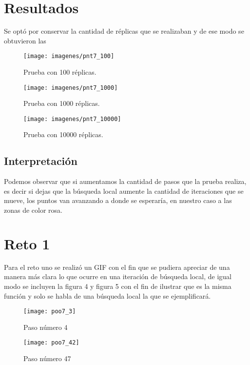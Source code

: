 \documentclass[a4paper]{article}
\begin{document}
\section{Resultados}
Se optó por conservar la cantidad de réplicas que se realizaban y de ese modo se obtuvieron las 

\begin{figure}[h!]
\centering
\texttt{[image: imagenes/pnt7\_100]}
\caption[Prueba con 100 réplicas.]{Prueba con 100 réplicas.}
\label{fig:pnt7_100}
\end{figure}

\begin{figure}[h!]
\centering
\texttt{[image: imagenes/pnt7\_1000]}
\caption{Prueba con 1000 réplicas.}
\label{fig:pnt7_1000}
\end{figure}
\begin{figure}[h!]
\centering
\texttt{[image: imagenes/pnt7\_10000]}
\caption{Prueba con 10000 réplicas.}
\label{fig:pnt7_10000}
\end{figure}


\subsection{Interpretación}
Podemos observar que si aumentamos la cantidad de pasos que la prueba realiza, es decir si dejas que la búsqueda local aumente la cantidad de iteraciones que se mueve, los puntos van avanzando a donde se esperaría, en nuestro caso a las zonas de color rosa. 

 
\section{Reto 1}
Para el reto uno se realizó un GIF con el fin que se pudiera apreciar de una manera más clara lo que ocurre en una iteración de búsqueda local, de igual modo se incluyen la figura 4 y figura 5 con el fin de ilustrar que es la misma función y solo se habla de una búsqueda local la que se ejemplificará.

\begin{figure}[h!]
\centering
\texttt{[image: poo7\_3]}
\caption{Paso número 4}
\label{fig:poo7_3}
\end{figure}

\begin{figure}[h!]
\centering
\texttt{[image: poo7\_42]}
\caption{Paso número 47}
\label{fig:poo7_42}
\end{figure}
 
\end{document}
